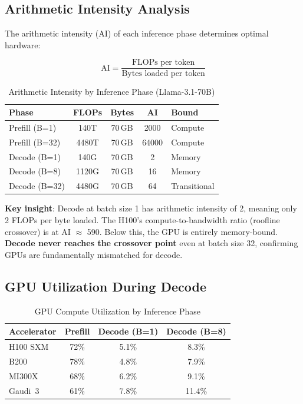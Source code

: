 \documentclass[conference,10pt]{IEEEtran}
\begin{document}
\subsection{Arithmetic Intensity Analysis}

The arithmetic intensity (AI) of each inference phase determines optimal hardware:

\begin{equation}
\text{AI} = \frac{\text{FLOPs per token}}{\text{Bytes loaded per token}}
\end{equation}

\begin{table}[!htbp]
\caption{Arithmetic Intensity by Inference Phase (Llama-3.1-70B)}
\label{tab:ai}
\centering\footnotesize
\begin{tabular}{@{}lcccl@{}}
\toprule
\textbf{Phase} & \textbf{FLOPs} & \textbf{Bytes} & \textbf{AI} & \textbf{Bound} \\
\midrule
Prefill (B=1) & 140T & 70\,GB & 2000 & Compute \\
Prefill (B=32) & 4480T & 70\,GB & 64000 & Compute \\
Decode (B=1) & 140G & 70\,GB & 2 & Memory \\
Decode (B=8) & 1120G & 70\,GB & 16 & Memory \\
Decode (B=32) & 4480G & 70\,GB & 64 & Transitional \\
\bottomrule
\end{tabular}
\end{table}

\textbf{Key insight}: Decode at batch size 1 has arithmetic intensity of 2, meaning only 2 FLOPs per byte loaded. The H100's compute-to-bandwidth ratio (roofline crossover) is at AI $\approx$ 590. Below this, the GPU is entirely memory-bound. \textbf{Decode never reaches the crossover point} even at batch size 32, confirming GPUs are fundamentally mismatched for decode.

\subsection{GPU Utilization During Decode}

\begin{table}[!htbp]
\caption{GPU Compute Utilization by Inference Phase}
\label{tab:util}
\centering\footnotesize
\begin{tabular}{@{}lccc@{}}
\toprule
\textbf{Accelerator} & \textbf{Prefill} & \textbf{Decode (B=1)} & \textbf{Decode (B=8)} \\
\midrule
H100 SXM & 72\% & 5.1\% & 8.3\% \\
B200 & 78\% & 4.8\% & 7.9\% \\
MI300X & 68\% & 6.2\% & 9.1\% \\
Gaudi~3 & 61\% & 7.8\% & 11.4\% \\
\bottomrule
\end{tabular}
\end{table}
\end{document}
